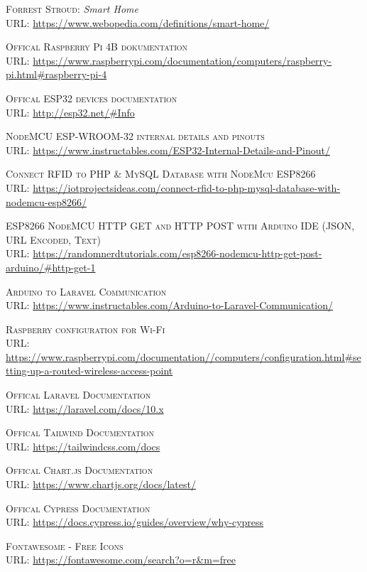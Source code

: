 \documentclass[
]{thesis-ekf}
\theoremstyle{definition}
\theoremstyle{remark}
\begin{document}
\begin{thebibliography}{20}
		\textsc{Forrest Stroud}: \emph{Smart Home}\\
		\textsc{URL:} \url{https://www.webopedia.com/definitions/smart-home/}
		
		\textsc{Offical Raspberry Pi 4B dokumentation}\\
		\textsc{URL:} \url{https://www.raspberrypi.com/documentation/computers/raspberry-pi.html#raspberry-pi-4}
		
		\textsc{Offical ESP32 devices documentation}\\
		\textsc{URL:} \url{http://esp32.net/#Info}
		
		\textsc{NodeMCU ESP-WROOM-32 internal details and pinouts}\\
		\textsc{URL:} \url{https://www.instructables.com/ESP32-Internal-Details-and-Pinout/}
		
		\textsc{Connect RFID to PHP \& MySQL Database with NodeMcu ESP8266}\\
		\textsc{URL:} \url{https://iotprojectsideas.com/connect-rfid-to-php-mysql-database-with-nodemcu-esp8266/}
		
		\textsc{ESP8266 NodeMCU HTTP GET and HTTP POST with Arduino IDE (JSON, URL Encoded, Text)}\\
		\textsc{URL:} \url{https://randomnerdtutorials.com/esp8266-nodemcu-http-get-post-arduino/#http-get-1}
		
		\textsc{Arduino to Laravel Communication}\\
		\textsc{URL:} \url{https://www.instructables.com/Arduino-to-Laravel-Communication/}
		
		\textsc{Raspberry configuration for Wi-Fi}\\
		\textsc{URL:} \url{https://www.raspberrypi.com/documentation//computers/configuration.html#setting-up-a-routed-wireless-access-point}
		
		\textsc{Offical Laravel Documentation}\\
		\textsc{URL:} \url{https://laravel.com/docs/10.x}
		
		\textsc{Offical Tailwind Documentation}\\
		\textsc{URL:} \url{https://tailwindcss.com/docs}
		
		\textsc{Offical Chart.js Documentation}\\
		\textsc{URL:} \url{https://www.chartjs.org/docs/latest/}
			
		\textsc{Offical Cypress Documentation}\\
		\textsc{URL:} \url{https://docs.cypress.io/guides/overview/why-cypress}
		
		\textsc{Fontawesome - Free Icons}\\
		\textsc{URL:} \url{https://fontawesome.com/search?o=r&m=free}
				
	\end{thebibliography}
	
	
\end{document}
